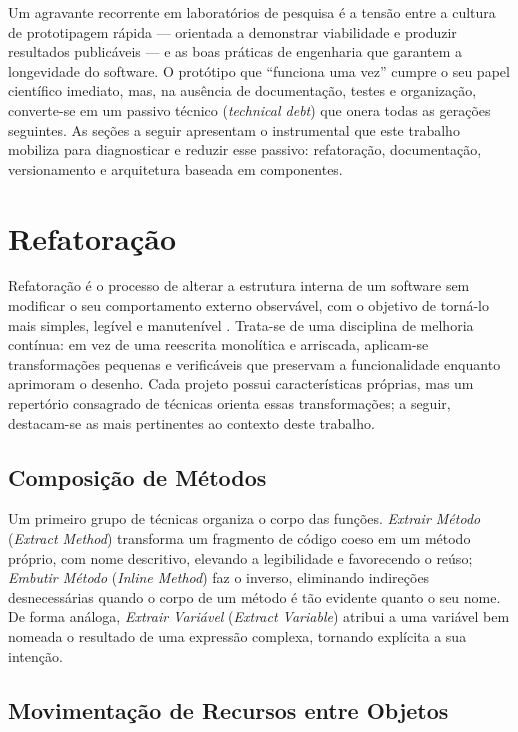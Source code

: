 Um agravante recorrente em laboratórios de pesquisa é a tensão entre a cultura de
prototipagem rápida --- orientada a demonstrar viabilidade e produzir resultados
publicáveis --- e as boas práticas de engenharia que garantem a longevidade do software. O
protótipo que ``funciona uma vez'' cumpre o seu papel científico imediato, mas, na ausência
de documentação, testes e organização, converte-se em um passivo técnico
(\emph{technical debt}) que onera todas as gerações seguintes. As seções a seguir
apresentam o instrumental que este trabalho mobiliza para diagnosticar e reduzir esse
passivo: refatoração, documentação, versionamento e arquitetura baseada em componentes.

\section{Refatoração}
\label{sec:refatoracao}

Refatoração é o processo de alterar a estrutura interna de um software sem modificar o seu
comportamento externo observável, com o objetivo de torná-lo mais simples, legível e
manutenível \cite{fowler2018}. Trata-se de uma disciplina de melhoria contínua: em vez de
uma reescrita monolítica e arriscada, aplicam-se transformações pequenas e verificáveis que
preservam a funcionalidade enquanto aprimoram o desenho. Cada projeto possui
características próprias, mas um repertório consagrado de técnicas orienta essas
transformações; a seguir, destacam-se as mais pertinentes ao contexto deste trabalho.

\subsection{Composição de Métodos}

Um primeiro grupo de técnicas organiza o corpo das funções. \emph{Extrair Método}
(\emph{Extract Method}) transforma um fragmento de código coeso em um método próprio, com
nome descritivo, elevando a legibilidade e favorecendo o reúso; \emph{Embutir Método}
(\emph{Inline Method}) faz o inverso, eliminando indireções desnecessárias quando o corpo
de um método é tão evidente quanto o seu nome. De forma análoga, \emph{Extrair Variável}
(\emph{Extract Variable}) atribui a uma variável bem nomeada o resultado de uma expressão
complexa, tornando explícita a sua intenção.

\subsection{Movimentação de Recursos entre Objetos}

